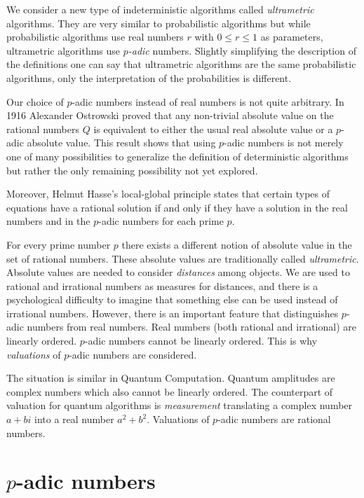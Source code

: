 \documentclass{llncs}
\begin{document}
We consider a new type of indeterministic algorithms called {\em ultrametric} algorithms. They are very similar to probabilistic algorithms but while probabilistic algorithms use real numbers $r$ with $0 \leq r \leq 1$ as parameters, ultrametric algorithms use {\em $p$-adic} numbers.
Slightly simplifying the description of the definitions one can say that ultrametric algorithms are the same probabilistic algorithms, only the interpretation of the probabilities is different. 

Our choice of $p$-adic numbers instead of real numbers is not quite arbitrary. In 1916 Alexander Ostrowski 
proved that any non-trivial absolute value on the rational numbers $Q$ is equivalent to either the usual real absolute value or a $p$-adic absolute value.
This result shows that using $p$-adic numbers is not merely one of many possibilities to generalize the definition of deterministic algorithms but rather the only remaining possibility not yet explored.

Moreover, Helmut Hasse's local-global principle
 states that certain types of equations have a rational solution if and only if they have a solution in the real numbers and in the $p$-adic numbers for each prime $p$.

For every prime number $p$ there exists a different notion of absolute value in the set of rational numbers. These absolute values are traditionally  called {\em ultrametric}. 
Absolute values are needed to consider {\em distances} among objects. We are used to rational and irrational numbers as measures for distances, and there is a psychological difficulty to imagine that something else can be used instead of irrational numbers.
However, there is an important feature that distinguishes $p$-adic numbers from real numbers. Real numbers (both rational and irrational) are linearly ordered.
$p$-adic numbers cannot be linearly ordered. This is why {\em valuations} of $p$-adic numbers are considered. 

The situation is similar in Quantum Computation. Quantum amplitudes are complex numbers which also cannot be linearly ordered. The counterpart of valuation for quantum algorithms is {\em measurement} translating a complex number $a + bi$ into a real number $a^2 + b^2$. Valuations of $p$-adic numbers are rational numbers.

\section{$p$-adic numbers}
\end{document}
